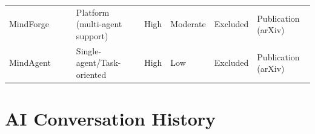 \documentclass[a4paper, 12pt]{article}
\begin{document}
\begin{table}[ht]
\begin{tabular}{@{}lllp{3cm}p{3cm}lp{3cm}l@{}}
        MindForge & \citeauthor{lica2025mindforgeempoweringembodiedagents} & \citeyear{lica2025mindforgeempoweringembodiedagents} & Platform (multi-agent support) & High & Moderate & Excluded & Publication (arXiv) \\
        MindAgent & \citeauthor{gong2023mindagentemergentgaminginteraction} & \citeyear{gong2023mindagentemergentgaminginteraction} & Single-agent/Task-oriented & High & Low & Excluded & Publication (arXiv) \\
        \bottomrule
    \end{tabular}
    \label{tab:casestudycomparison}
\end{table}

\section{AI Conversation History}
\label{appendix:aiconversationhistory}


\end{document}
